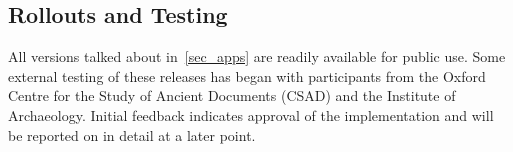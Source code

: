\subsection{Rollouts and Testing}
All versions talked about in~\autoref{sec_apps} are readily available for public
use. Some external testing of these releases has began with participants from the Oxford Centre
for the Study of Ancient Documents (CSAD) and the Institute of Archaeology.
Initial feedback indicates approval of the implementation and will be reported
on in detail at a later point.